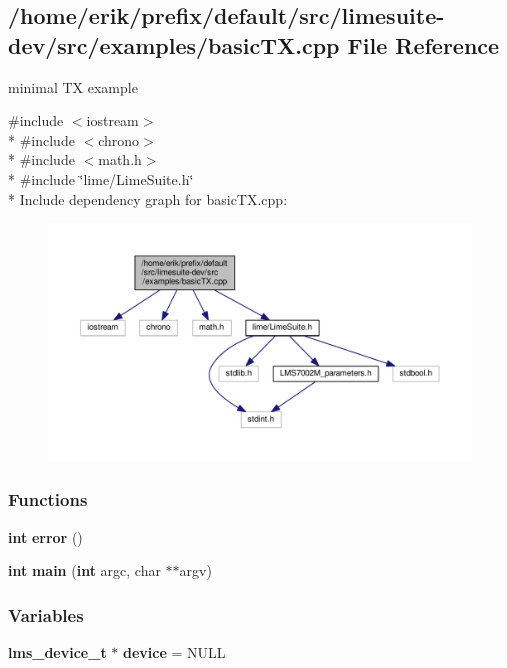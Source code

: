 \subsection{/home/erik/prefix/default/src/limesuite-\/dev/src/examples/basic\+TX.cpp File Reference}
\label{basicTX_8cpp}


minimal TX example  


{\ttfamily \#include $<$iostream$>$}\\*
{\ttfamily \#include $<$chrono$>$}\\*
{\ttfamily \#include $<$math.\+h$>$}\\*
{\ttfamily \#include \char`\"{}lime/\+Lime\+Suite.\+h\char`\"{}}\\*
Include dependency graph for basic\+T\+X.\+cpp\+:
\nopagebreak
\begin{figure}[H]
\begin{center}
\leavevmode
\includegraphics[width=350pt]{d5/ddf/basicTX_8cpp__incl}
\end{center}
\end{figure}
\subsubsection*{Functions}
\begin{DoxyCompactItemize}
\item 
{\bf int} {\bf error} ()
\item 
{\bf int} {\bf main} ({\bf int} argc, char $\ast$$\ast$argv)
\end{DoxyCompactItemize}
\subsubsection*{Variables}
\begin{DoxyCompactItemize}
\item 
{\bf lms\+\_\+device\+\_\+t} $\ast$ {\bf device} = N\+U\+LL
\end{DoxyCompactItemize}


